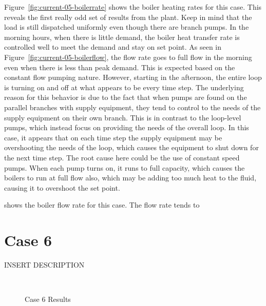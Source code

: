 \documentclass{report}
\begin{document}
            Figure~\ref{fig:current-05-boilerrate} shows the boiler heating rates for this case.
            This reveals the first really odd set of results from the plant.
            Keep in mind that the load is still dispatched uniformly even though there are branch pumps.
            In the morning hours, when there is little demand, the boiler heat transfer rate is controlled well to meet the demand and stay on set point.
            As seen in Figure~\ref{fig:current-05-boilerflow}, the flow rate goes to full flow in the morning even when there is less than peak demand.
            This is expected based on the constant flow pumping nature.
            However, starting in the afternoon, the entire loop is turning on and off at what appears to be every time step.
            The underlying reason for this behavior is due to the fact that when pumps are found on the parallel branches with supply equipment, they tend to control to the needs of the supply equipment on their own branch.
            This is in contrast to the loop-level pumps, which instead focus on providing the needs of the overall loop.
            In this case, it appears that on each time step the supply equipment may be overshooting the needs of the loop, which causes the equipment to shut down for the next time step.
            The root cause here could be the use of constant speed pumps.
            When each pump turns on, it runs to full capacity, which causes the boilers to run at full flow also, which may be adding too much heat to the fluid, causing it to overshoot the set point.

            shows the boiler flow rate for this case.
            The flow rate tends to

        \section{Case 6}\label{sec:current-06}

            INSERT DESCRIPTION

            \begin{figure*}[hbt]
                \centering
                ~
                \caption{Case 6 Results}
            \end{figure*}
\end{document}

